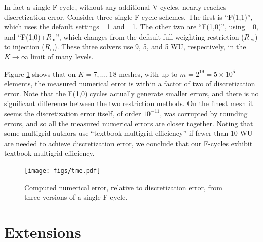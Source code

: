 \documentclass[letterpaper,final,12pt,reqno]{amsart}
\newcommand{\Rin}{R_{\text{in}}}
\newcommand{\Rfw}{R_{\text{fw}}}
\begin{document}
In fact a single F-cycle, without any additional V-cycles, nearly reaches discretization error.  Consider three single-F-cycle schemes.  The first is ``F(1,1)'', which uses the default settings =1 and =1.  The other two are ``F(1,0)'', using =0, and ``F(1,0)+$\Rin$'', which changes from the default full-weighting restriction ($\Rfw$) to injection ($\Rin$).  These three solvers use 9, 5, and 5 WU, respectively, in the $K\to\infty$ limit of many levels.

Figure \ref{fig:tme} shows that on $K=7,\dots,18$ meshes, with up to $m=2^{19} = 5 \times 10^5$ elements, the measured numerical error is within a factor of two of discretization error.  Note that the F(1,0) cycles actually generate smaller errors, and there is no significant difference between the two restriction methods.  On the finest mesh it seems the discretization error itself, of order $10^{-11}$, was corrupted by rounding errors, and so all the measured numerical errors are closer together.  Noting that some multigrid authors \cite[for example]{BrownSmithAhmadia2013} use ``textbook multigrid efficiency'' if fewer than 10 WU are needed to achieve discretization error, we conclude that our F-cycles exhibit textbook multigrid efficiency.

\begin{figure}
\texttt{[image: figs/tme.pdf]}
\caption{Computed numerical error, relative to discretization error, from three versions of a single F-cycle.}
\label{fig:tme}
\end{figure}


\section{Extensions}  \label{sec:extensions}
\end{document}
